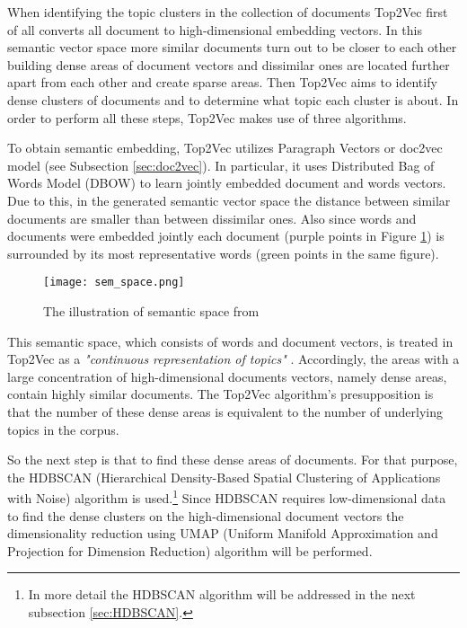 \documentclass[fontsize=12pt,a4paper,twoside,openany]{scrbook}
\begin{document}
When identifying the topic clusters in the collection of documents Top2Vec first of all converts all document to high-dimensional embedding vectors. In this semantic vector space more similar documents turn out to be closer to each other building dense areas of document vectors and dissimilar ones are located further apart from each other and create sparse areas. Then Top2Vec aims to identify dense clusters of documents and to determine what topic each cluster is about. In order to perform all these steps, Top2Vec makes use of three algorithms.

To obtain semantic embedding, Top2Vec utilizes Paragraph Vectors or doc2vec model (see Subsection \ref{sec:doc2vec}). In particular, it uses Distributed Bag of Words Model (DBOW) to learn jointly embedded document and words vectors. Due to this, in the generated semantic vector space the distance between similar documents are smaller than between dissimilar ones. Also since words and documents were embedded jointly each document (purple points in Figure \ref{fig:sem_space}) is surrounded by its most representative words (green points in the same figure).  

\begin{figure}[h]
\centering
\texttt{[image: sem\_space.png]}
\caption{The illustration of semantic space from \parencite{Angelov20}}
\label{fig:sem_space}
\end{figure}

This semantic space, which consists of words and document vectors, is treated in Top2Vec as a \emph{"continuous representation of topics"} \parencite[p.~3]{Angelov20}. Accordingly, the areas with a large concentration of high-dimensional documents vectors, namely dense areas, contain highly similar documents. The Top2Vec algorithm's presupposition is that the number of these dense areas is equivalent to the number of underlying topics in the corpus. 

So the next step is that to find these dense areas of documents. For that purpose, the HDBSCAN (Hierarchical Density-Based Spatial Clustering of Applications with Noise) \parencite{McInnes17b, McInnes17a} algorithm is used.\footnote{In more detail the HDBSCAN algorithm will be addressed in the next subsection \ref{sec:HDBSCAN}.} Since HDBSCAN requires low-dimensional data to find the dense clusters on the high-dimensional document vectors the dimensionality reduction using UMAP (Uniform Manifold Approximation and Projection for Dimension Reduction) algorithm \parencite{McInnes18, McInnes20} will be performed.
\end{document}
